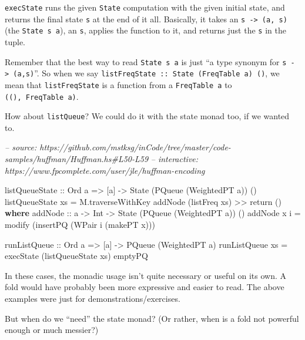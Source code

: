 \documentclass[]{article}
\newenvironment{Shaded}{}{}
\newcommand{\CommentTok}[1]{\textcolor[rgb]{0.38,0.63,0.69}{\textit{#1}}}
\newcommand{\DataTypeTok}[1]{\textcolor[rgb]{0.56,0.13,0.00}{#1}}
\newcommand{\FunctionTok}[1]{\textcolor[rgb]{0.02,0.16,0.49}{#1}}
\newcommand{\KeywordTok}[1]{\textcolor[rgb]{0.00,0.44,0.13}{\textbf{#1}}}
\newcommand{\NormalTok}[1]{#1}
\newcommand{\OtherTok}[1]{\textcolor[rgb]{0.00,0.44,0.13}{#1}}
\begin{document}
\texttt{execState} runs the given \texttt{State} computation with the given
initial state, and returns the final state \texttt{s} at the end of it all.
Basically, it takes an \texttt{s\ -\textgreater{}\ (a,\ s)} (the
\texttt{State\ s\ a}), an \texttt{s}, applies the function to it, and returns
just the \texttt{s} in the tuple.

Remember that the best way to read \texttt{State\ s\ a} is just ``a type synonym
for \texttt{s\ -\textgreater{}\ (a,s)}''. So when we say
\texttt{listFreqState\ ::\ State\ (FreqTable\ a)\ ()}, we mean that
\texttt{listFreqState} is a function from a \texttt{FreqTable\ a} to
\texttt{((),\ FreqTable\ a)}.

How about \texttt{listQueue}? We could do it with the state monad too, if we
wanted to.

\begin{Shaded}
\begin{Highlighting}[]
\CommentTok{-- source: https://github.com/mstksg/inCode/tree/master/code-samples/huffman/Huffman.hs#L50-L59}
\CommentTok{-- interactive: https://www.fpcomplete.com/user/jle/huffman-encoding}

\OtherTok{listQueueState ::} \DataTypeTok{Ord}\NormalTok{ a }\OtherTok{=>}\NormalTok{ [a] }\OtherTok{->} \DataTypeTok{State}\NormalTok{ (}\DataTypeTok{PQueue}\NormalTok{ (}\DataTypeTok{WeightedPT}\NormalTok{ a)) ()}
\NormalTok{listQueueState xs }\FunctionTok{=}\NormalTok{ M.traverseWithKey addNode (listFreq xs) }\FunctionTok{>>}\NormalTok{ return ()}
  \KeywordTok{where}
\OtherTok{    addNode ::}\NormalTok{ a }\OtherTok{->} \DataTypeTok{Int} \OtherTok{->} \DataTypeTok{State}\NormalTok{ (}\DataTypeTok{PQueue}\NormalTok{ (}\DataTypeTok{WeightedPT}\NormalTok{ a)) ()}
\NormalTok{    addNode x i }\FunctionTok{=}\NormalTok{ modify (insertPQ (}\DataTypeTok{WPair}\NormalTok{ i (makePT x)))}

\OtherTok{runListQueue ::} \DataTypeTok{Ord}\NormalTok{ a }\OtherTok{=>}\NormalTok{ [a] }\OtherTok{->} \DataTypeTok{PQueue}\NormalTok{ (}\DataTypeTok{WeightedPT}\NormalTok{ a)}
\NormalTok{runListQueue xs }\FunctionTok{=}\NormalTok{ execState (listQueueState xs) emptyPQ}
\end{Highlighting}
\end{Shaded}

In these cases, the monadic usage isn't quite necessary or useful on its own. A
fold would have probably been more expressive and easier to read. The above
examples were just for demonstrations/exercises.

But when do we ``need'' the state monad? (Or rather, when is a fold not powerful
enough or much messier?)
\end{document}
